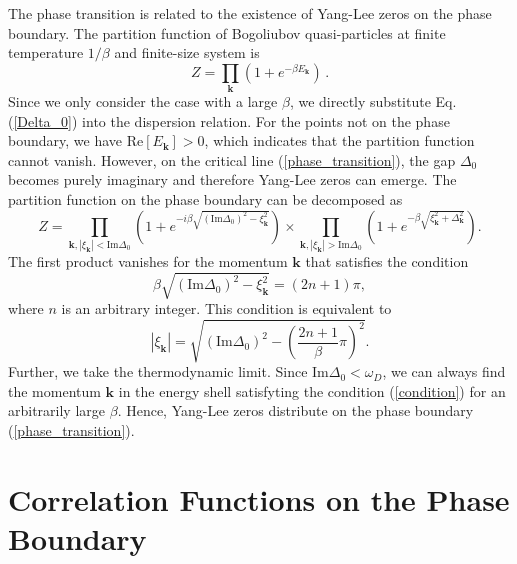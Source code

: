 \documentclass[aps,prl,twocolumn,nofootinbib,superscriptaddress,longbibliography]{revtex4-1}
\begin{document}
The phase transition is related to the existence of Yang-Lee zeros on the phase boundary. The partition function of Bogoliubov quasi-particles at finite temperature $1/\beta$ and finite-size system is
\begin{equation}
  Z = \prod_{\bm{k}} (1 + e^{-\beta E_{\bm{k}}})\,.
\end{equation}
 Since we only consider the case with a large $\beta$, we directly substitute Eq. (\ref{Delta_0}) into the dispersion relation. For the points not on the phase boundary, we have $\text{Re}
 [E_{\bm{k}}] > 0$, which indicates that the
 partition function cannot vanish. However, on the critical line (\ref{phase_transition}), the gap $\Delta_0$ becomes purely imaginary and therefore Yang-Lee zeros can emerge. The partition function on the phase boundary can be decomposed as
\begin{equation}
  Z = \prod_{\bm{k},|\xi_{\bm{k}}|<\text{Im}\Delta_0} \left( 1 + e^{- i \beta \sqrt{\left( \text{Im}\Delta_0 \right)^2 - \xi_{\bm{k}}^2}} \right)\times \prod_{\bm{k},|\xi_{\bm{k}}|>\text{Im}\Delta_0}\left( 1 + e^{- \beta \sqrt{\xi_{\bm{k}}^2 +\Delta_{\bm{k}}^2 }} \right).
\end{equation}
The first product vanishes for the momentum $\bm{k}$ that satisfies the condition
\begin{equation}
  \beta \sqrt{\left( \text{Im} \Delta_0 \right)^2 - \xi_{\bm{k}}^2} = (2n + 1) \pi,
\end{equation}
where $n$ is an arbitrary integer. This condition is equivalent to
\begin{equation}
 |\xi_{\bm{k}}| = \sqrt{\left( \text{Im} \Delta_0
  \right)^2 - \left( \frac{2 n + 1}{\beta} \pi \right)^2}.
  \label{condition}
\end{equation}
 Further, we take the thermodynamic limit. Since $\text{Im}\Delta_0<\omega_D$, we can always find the momentum $\bm{k}$ in the energy shell satisfyting the condition (\ref{condition}) for an arbitrarily large $\beta$. Hence, Yang-Lee zeros distribute on the phase boundary (\ref{phase_transition}). 

\section{Correlation Functions on the Phase Boundary}\label{SectionOn}
\end{document}
